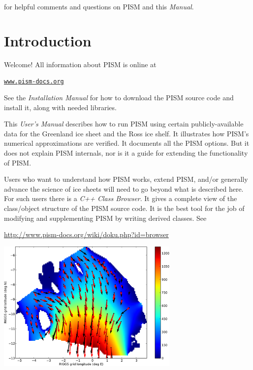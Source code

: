\documentclass[titlepage,letterpaper,final]{scrartcl}
\newcommand{\PISMBROWSERURL}{http://www.pism-docs.org/wiki/doku.php?id=browser}
\renewcommand{\t}[1]{\texttt{#1}}
\begin{document}
\noindent for helpful comments and questions on PISM and this \emph{Manual}.
\normalsize



\newpage
\setcounter{tocdepth}{3}
\small
\tableofcontents
\normalsize

\newpage


\section{Introduction}\label{sect:intro}

Welcome!  All information about PISM is online at
\begin{center}
  \href{http://www.pism-docs.org}{\t{www.pism-docs.org}}
\end{center}

See the \emph{Installation Manual} for how to download the PISM source code and install it, along with needed libraries.

This \emph{User's Manual} describes how to run PISM using certain publicly-available data for the Greenland ice sheet and the Ross ice shelf.  It illustrates how PISM's numerical approximations are verified.  It documents all the PISM options.  But it does not explain PISM internals, nor is it a guide for extending the functionality of PISM.

Users who want to understand how PISM works, extend PISM, and/or generally advance the science of ice sheets will need to go beyond what is described here.  For such users there is a \emph{C++ Class Browser}.  It gives a complete view of the class/object structure of the PISM source code.  It is the best tool for the job of modifying and supplementing PISM by writing derived classes.  See
\begin{center}
  \url{\PISMBROWSERURL}
\end{center}

\vspace{.4in}
  
\begin{center}
\includegraphics[width=3.5in,keepaspectratio=true]{rossquiver}
\end{center}
\end{document}
